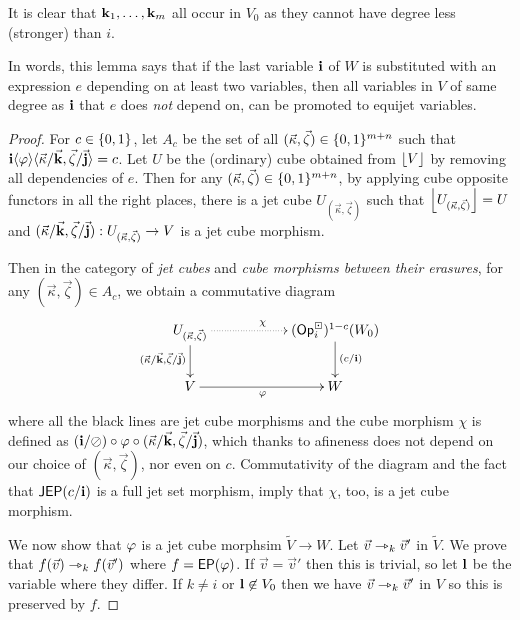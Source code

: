 \documentclass[a4paper]{memoir}
\begin{document}
It is clear that $\mathbf{k}_1, \ldots, \mathbf{k}_m$ all occur in $V_0$ as they cannot have degree less (stronger) than $i$.

In words, this lemma says that if the last variable $\mathbf{i}$ of $W$ is substituted with an expression $e$ depending on at least two variables, then all variables in $V$ of same degree as $\mathbf{i}$ that $e$ does \emph{not} depend on, can be promoted to equijet variables.
\begin{proof}
	For $c \in \mathopen{}\left\{ 0, 1 \right\}\mathclose{}$, let $A_c$ be the set of all $(\vec \kappa, \vec \zeta) \in \mathopen{}\left\{ 0, 1 \right\}\mathclose{}^{m+n}$ such that $\mathbf{i} \langle \varphi \rangle \langle \vec \kappa / \vec{\mathbf{k}}, \vec \zeta / \vec{\mathbf{j}} \rangle = c$.
	Let $U$ be the (ordinary) cube obtained from $\mathopen{}\left\lfloor V \right\rfloor\mathclose{}$ by removing all dependencies of $e$.
	Then for any $(\vec \kappa, \vec \zeta) \in \mathopen{}\left\{ 0, 1 \right\}\mathclose{}^{m+n}$, by applying cube opposite functors in all the right places, there is a jet cube $U_{(\vec \kappa, \vec \zeta)}$ such that $\mathopen{}\left\lfloor U_{(\vec \kappa, \vec \zeta)} \right\rfloor\mathclose{} = U$ and $(\vec \kappa / \vec{\mathbf{k}}, \vec \zeta / \vec{\mathbf{j}}) : U_{(\vec \kappa, \vec \zeta)} \to V$ is a jet cube morphism.
	
	Then in the category of \emph{jet cubes} and \emph{cube morphisms between their erasures}, for any $(\vec \kappa, \vec \zeta) \in A_c$, we obtain a commutative diagram
	\[
		\xymatrix{
			U_{(\vec \kappa, \vec \zeta)}
				\ar[d]_{(\vec \kappa / \vec{\dm k}, \vec \zeta / \vec{\dm j})}
				\ar@{.>}[rr]^\chi
			&&
			(\Opcube_i)^{1-c}(W_0)
				\ar[d]^{(c/\dm i)}
			\\
			V
				\ar[rr]_{\vfi}
			&&
			W
		}
	\]
	where all the black lines are jet cube morphisms and the cube morphism $\chi$ is defined as $(\mathbf{i} / \oslash) \circ \varphi \circ (\vec \kappa / \vec{\mathbf{k}}, \vec \zeta / \vec{\mathbf{j}})$, which thanks to afineness does not depend on our choice of $(\vec \kappa, \vec \zeta)$, nor even on $c$.
	Commutativity of the diagram and the fact that $\mathsf{JEP}(c/\mathbf{i})$ is a full jet set morphism, imply that $\chi$, too, is a jet cube morphism.
	
	We now show that $\varphi$ is a jet cube morphsim $\tilde V \to W$.
	Let $\vec v \rightarrowtriangle_k \vec v'$ in $\tilde V$.
	We prove that $f(\vec v) \rightarrowtriangle_k f(\vec v')$ where $f = \mathsf{EP}(\varphi)$.
	If $\vec v = \vec v'$ then this is trivial, so let $\mathbf{l}$ be the variable where they differ.
	If $k \neq i$ or $\mathbf{l} \not\in V_0$ then we have $\vec v \rightarrowtriangle_k \vec v'$ in $V$ so this is preserved by $f$.
	

\end{proof}
\end{document}
